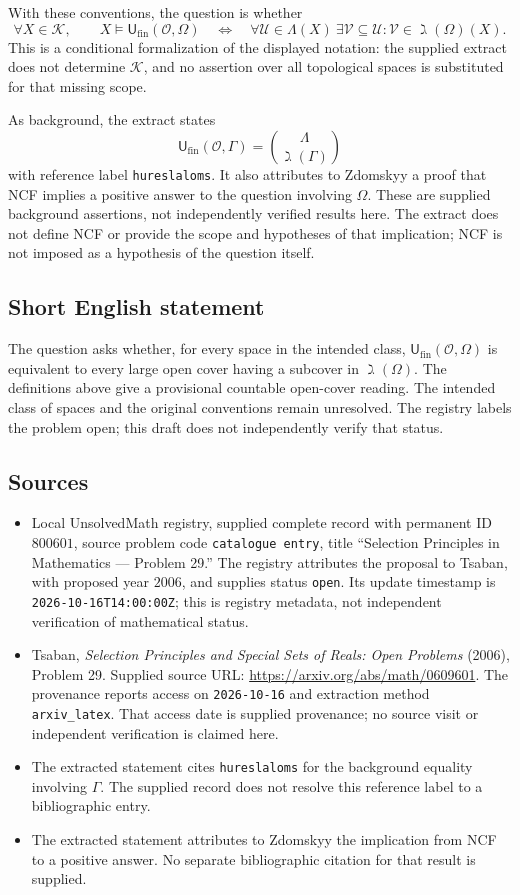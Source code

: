 \documentclass[11pt]{article}
\begin{document}
With these conventions, the question is whether
\[
\forall X\in\mathscr K,\qquad
X\models\mathsf U_{\mathrm{fin}}(\mathcal O,\Omega)
\quad\Longleftrightarrow\quad
\forall\mathcal U\in\Lambda(X)\ \exists\mathcal V\subseteq\mathcal U:
\mathcal V\in\gimel(\Omega)(X).
\]
This is a conditional formalization of the displayed notation: the supplied extract does not determine \(\mathscr K\), and no assertion over all topological spaces is substituted for that missing scope.

As background, the extract states
\[
\mathsf U_{\mathrm{fin}}(\mathcal O,\Gamma)
=\binom{\Lambda}{\gimel(\Gamma)}
\]
with reference label \texttt{hureslaloms}. It also attributes to Zdomskyy a proof that NCF implies a positive answer to the question involving \(\Omega\). These are supplied background assertions, not independently verified results here. The extract does not define NCF or provide the scope and hypotheses of that implication; NCF is not imposed as a hypothesis of the question itself.
\subsection{Short English statement}
The question asks whether, for every space in the intended class, \(\mathsf U_{\mathrm{fin}}(\mathcal O,\Omega)\) is equivalent to every large open cover having a subcover in \(\gimel(\Omega)\). The definitions above give a provisional countable open-cover reading. The intended class of spaces and the original conventions remain unresolved. The registry labels the problem open; this draft does not independently verify that status.
\subsection{Sources}
\begin{itemize}
\item Local UnsolvedMath registry, supplied complete record with permanent ID \(800601\), source problem code \texttt{catalogue entry}, title ``Selection Principles in Mathematics --- Problem 29.'' The registry attributes the proposal to Tsaban, with proposed year \(2006\), and supplies status \texttt{open}. Its update timestamp is \texttt{2026-10-16T14:00:00Z}; this is registry metadata, not independent verification of mathematical status.
\item Tsaban, \emph{Selection Principles and Special Sets of Reals: Open Problems} (2006), Problem 29. Supplied source URL: \url{https://arxiv.org/abs/math/0609601}. The provenance reports access on \texttt{2026-10-16} and extraction method \texttt{arxiv\_latex}. That access date is supplied provenance; no source visit or independent verification is claimed here.
\item The extracted statement cites \texttt{hureslaloms} for the background equality involving \(\Gamma\). The supplied record does not resolve this reference label to a bibliographic entry.
\item The extracted statement attributes to Zdomskyy the implication from NCF to a positive answer. No separate bibliographic citation for that result is supplied.
\end{itemize}
\end{document}
